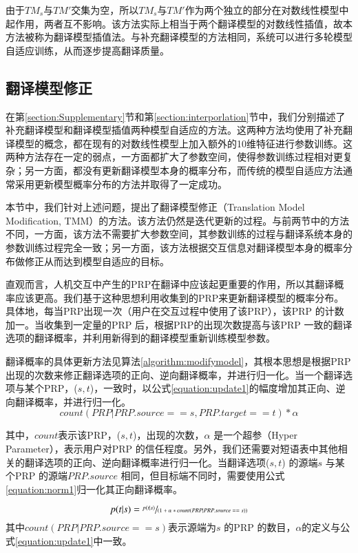 \documentclass[master, winfont]{njuthesis}
\begin{document}
由于$TM_s$与$TM'$交集为空，所以$TM_s$与$TM'$作为两个独立的部分在对数线性模型中起作用，两者互不影响。该方法实际上相当于两个翻译模型的对数线性插值，故本方法被称为翻译模型插值法。与补充翻译模型的方法相同，系统可以进行多轮模型自适应训练，从而逐步提高翻译质量。
\subsection{翻译模型修正}
\label{section:modify}
在第\ref{section:Supplementary}节和第\ref{section:interporlation}节中，我们分别描述了补充翻译模型和翻译模型插值两种模型自适应的方法。这两种方法均使用了补充翻译模型的概念，都在现有的对数线性模型上加入额外的10维特征进行参数训练。这两种方法存在一定的弱点，一方面都扩大了参数空间，使得参数训练过程相对更复杂；另一方面，都没有更新翻译模型本身的概率分布，而传统的模型自适应方法通常采用更新模型概率分布的方法并取得了一定成功。

本节中，我们针对上述问题，提出了翻译模型修正（Translation Model Modification, TMM）的方法。该方法仍然是迭代更新的过程。与前两节中的方法不同，一方面，该方法不需要扩大参数空间，其参数训练的过程与翻译系统本身的参数训练过程完全一致；另一方面，该方法根据交互信息对翻译模型本身的概率分布做修正从而达到模型自适应的目标。

直观而言，人机交互中产生的PRP在翻译中应该起更重要的作用，所以其翻译概率应该更高。我们基于这种思想利用收集到的PRP来更新翻译模型的概率分布。具体地，每当PRP出现一次（用户在交互过程中使用了该PRP），该PRP 的计数加一。当收集到一定量的PRP 后，根据PRP的出现次数提高与该PRP 一致的翻译选项的翻译概率，并利用新得到的翻译模型重新训练模型参数。

翻译概率的具体更新方法见算法\ref{algorithm:modifymodel}，其根本思想是根据PRP出现的次数来修正翻译选项的正向、逆向翻译概率，并进行归一化。当一个翻译选项与某个PRP，($s, t$)，一致时，以公式\ref{equation:update1}的幅度增加其正向、逆向翻译概率，并进行归一化。
\begin{equation}
\label{equation:update1}
  count(PRP|PRP.source==s, PRP.target==t) * \alpha
\end{equation}

其中，$count$表示该PRP，($s,t$)，出现的次数，$\alpha$ 是一个超参（Hyper Parameter），表示用户对PRP 的信任程度。另外，我们还需要对短语表中其他相关的翻译选项的正向、逆向翻译概率进行归一化。当翻译选项($s,t$) 的源端$s$ 与某个PRP 的源端$PRP.source$ 相同，但目标端不同时，需要使用公式\ref{equation:norm1}归一化其正向翻译概率。

\begin{equation}
  \label{equation:norm1}
  p(t|s)=\sfrac{p(t|s)}{(1 + \alpha*count(PRP|PRP.source == s))}
\end{equation}
其中$count(PRP|PRP.source == s)$表示源端为$s$ 的PRP 的数目，$\alpha$的定义与公式\ref{equation:update1}中一致。
\end{document}
